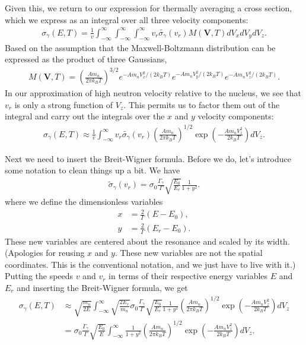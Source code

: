 Given this, we return to our expression for thermally averaging a cross section, which we express as an integral over all three velocity components:
\begin{align}
  \sigma_\gamma(E,T) = \frac{1}{v} \int_{-\infty}^\infty \int_{-\infty}^\infty \int_{-\infty}^\infty v_r \tilde{\sigma_\gamma}(v_r) M(\mathbf{V},T) dV_x dV_y dV_z .
\end{align}
Based on the assumption that the Maxwell-Boltzmann distribution can be expressed as the product of three Gaussians,
\begin{align}
  M(\mathbf{V},T) = \left( \frac{ A m_n }{ 2 \pi k_B T } \right)^{3/2}
  e^{-A m_n V_x^2 / ( 2 k_B T ) } e^{-A m_n V_y^2 / ( 2 k_B T ) }  e^{-A m_n V_z^2 / ( 2 k_B T ) } .
\end{align}
In our approximation of high neutron velocity relative to the nucleus, we see that $v_r$ is only a strong function of $V_z$. This permits us to factor them out of the integral and carry out the integrals over the $x$ and $y$ velocity components:
\begin{align}
  \sigma_\gamma(E,T) \approx \frac{1}{v} \int_{-\infty}^\infty v_r \tilde{\sigma_\gamma}(v_r) \left( \frac{ A m_n }{ 2 \pi k_B T } \right)^{1/2} \exp \left( -\frac{ A m_n V_z^2 }{ 2 k_B T } \right) dV_z .
\end{align}

Next we need to insert the Breit-Wigner formula. Before we do, let's introduce some notation to clean things up a bit. We have
\begin{align}
  \tilde{\sigma}_\gamma(v_r) =  \sigma_0 \frac{\Gamma_\gamma}{\Gamma}  \sqrt{ \frac{E_0}{E_r} } \frac{ 1 }{ 1 + y^2 } .
\end{align}
where we define the dimensionless variables
\begin{subequations} \label{Eq:nuclearData_DopplerBroadening_TransformVariables}
\begin{align}
  x &= \frac{2}{\Gamma} ( E - E_0 ), \\
  y &= \frac{2}{\Gamma} ( E_r - E_0 ) .
\end{align}
\end{subequations}
These new variables are centered about the resonance and scaled by its width. (Apologies for reusing $x$ and $y$. These new variables are not the spatial coordinates. This is the conventional notation, and we just have to live with it.) Putting the speeds $v$ and $v_r$ in terms of their respective energy variables $E$ and $E_r$ and inserting the Breit-Wigner formula, we get
\begin{align}
  \sigma_\gamma(E,T) &\approx \sqrt{\frac{m_n}{2E}} \int_{-\infty}^\infty \sqrt{ \frac{2E_r}{m_n} }  \sigma_0 \frac{\Gamma_\gamma}{\Gamma}  \sqrt{ \frac{E_0}{E_r} } \frac{ 1 }{ 1 + y^2 } \left( \frac{ A m_n }{ 2 \pi k_B T } \right)^{1/2} \exp \left( -\frac{ A m_n V_z^2 }{ 2 k_B T } \right) dV_z \nonumber \\
  &= \sigma_0  \frac{\Gamma_\gamma}{\Gamma} \sqrt{ \frac{E_0}{E} } \int_{-\infty}^\infty  \frac{ 1 }{ 1 + y^2 } \left( \frac{ A m_n }{ 2 \pi k_B T } \right)^{1/2} \exp \left( -\frac{ A m_n V_z^2 }{ 2 k_B T } \right) dV_z .
\end{align} 

